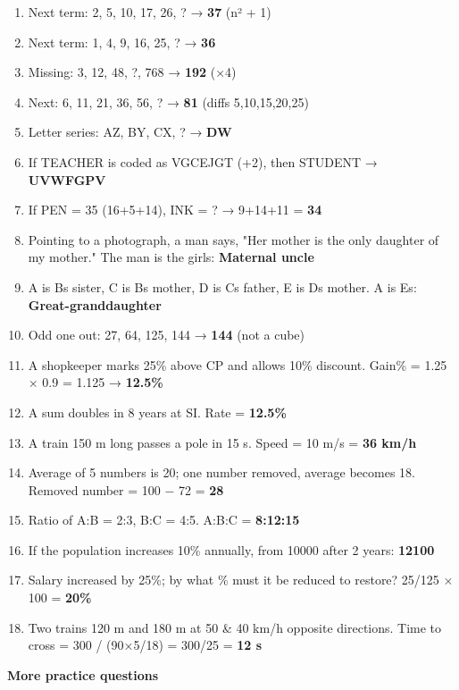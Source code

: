 \begin{enumerate}
\def\labelenumi{\arabic{enumi}.}
\tightlist
\item
  Next term: 2, 5, 10, 17, 26, ? → \textbf{37} (n² + 1)
\item
  Next term: 1, 4, 9, 16, 25, ? → \textbf{36}
\item
  Missing: 3, 12, 48, ?, 768 → \textbf{192} (×4)
\item
  Next: 6, 11, 21, 36, 56, ? → \textbf{81} (diffs 5,10,15,20,25)
\item
  Letter series: AZ, BY, CX, ? → \textbf{DW}
\item
  If TEACHER is coded as VGCEJGT (+2), then STUDENT → \textbf{UVWFGPV}
\item
  If PEN = 35 (16+5+14), INK = ? → 9+14+11 = \textbf{34}
\item
  Pointing to a photograph, a man says, "Her mother is the only daughter of my mother." The man is the girl\textquotesingle s: \textbf{Maternal uncle}
\item
  A is B\textquotesingle s sister, C is B\textquotesingle s mother, D is C\textquotesingle s father, E is D\textquotesingle s mother. A is E\textquotesingle s: \textbf{Great-granddaughter}
\item
  Odd one out: 27, 64, 125, 144 → \textbf{144} (not a cube)
\item
  A shopkeeper marks 25\% above CP and allows 10\% discount. Gain\% = 1.25 × 0.9 = 1.125 → \textbf{12.5\%}
\item
  A sum doubles in 8 years at SI. Rate = \textbf{12.5\%}
\item
  A train 150 m long passes a pole in 15 s. Speed = 10 m/s = \textbf{36 km/h}
\item
  Average of 5 numbers is 20; one number removed, average becomes 18. Removed number = 100 − 72 = \textbf{28}
\item
  Ratio of A:B = 2:3, B:C = 4:5. A:B:C = \textbf{8:12:15}
\item
  If the population increases 10\% annually, from 10000 after 2 years: \textbf{12100}
\item
  Salary increased by 25\%; by what \% must it be reduced to restore? 25/125 × 100 = \textbf{20\%}
\item
  Two trains 120 m and 180 m at 50 \& 40 km/h opposite directions. Time to cross = 300 / (90×5/18) = 300/25 = \textbf{12 s}
\end{enumerate}

\textbf{More practice questions}

